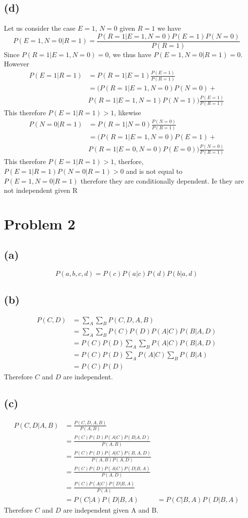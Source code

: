 \documentclass[12pt]{article}
\begin{document}
\subsection*{(d)}
Let us consider the case $E=1$, $N=0$ given $R=1$ we have
$$P(E=1,N=0|R=1)=\frac{P(R=1|E=1,N=0)P(E=1)P(N=0)}{P(R=1)}$$
Since $P(R=1|E=1,N=0)=0$, we thus have $P(E=1,N=0|R=1)=0$. However 
\begin{align*}
    P(E=1|R=1)&=P(R=1|E=1)\frac{P(E=1)}{P(R=1)}\\
    &=(P(R=1|E=1,N=0)P(N=0)+\\
    &P(R=1|E=1,N=1)P(N=1))\frac{P(E=1)}{P(R=1)}
\end{align*}
This therefore $P(E=1|R=1)>1$, likewise
\begin{align*}
    P(N=0|R=1)&=P(R=1|N=0)\frac{P(N=0)}{P(R=1)}\\
    &=(P(R=1|E=1,N=0)P(E=1)+\\
    &P(R=1|E=0,N=0)P(E=0))\frac{P(N=0)}{P(R=1)}
\end{align*}
This therefore $P(E=1|R=1)>1$, therfore, $P(E=1|R=1)P(N=0|R=1)>0$ and is not equal to $P(E=1,N=0|R=1)$ therefore they are conditionally dependent.
Ie they are not independent given R
\section*{Problem 2}
\subsection*{(a)}
$$\boxed{P(a,b,c,d)=P(c)P(a|c)P(d)P(b|a,d)}$$
\subsection*{(b)}
\begin{align*}
    P(C,D)&=\sum_{A}\sum_{B}P(C,D,A,B)\\
    &=\sum_{A}\sum_{B}P(C)P(D)P(A|C)P(B|A,D)\\
    &=P(C)P(D)\sum_{A}\sum_{B}P(A|C)P(B|A,D)\\
    &=P(C)P(D)\sum_{A}P(A|C)\sum_{B}P(B|A)\\
    &=P(C)P(D)
\end{align*}
Therefore $C$ and $D$ are independent.
\subsection*{(c)}
\begin{align*}
    P(C,D|A,B)&=\frac{P(C,D,A,B)}{P(A,B)}\\
    &=\frac{P(C)P(D)P(A|C)P(B|A,D)}{P(A,B)}\\
    &=\frac{P(C)P(D)P(A|C)P(B,A,D)}{P(A,B)P(A,D)}\\
    &=\frac{P(C)P(D)P(A|C)P(D|B,A)}{P(A,D)}\\
    &=\frac{P(C)P(A|C)P(D|B,A)}{P(A)}\\
    &=P(C|A)P(D|B,A)
    &=P(C|B,A)P(D|B,A)
\end{align*}
Therefore $C$ and $D$ are independent given A and B.
\end{document}
